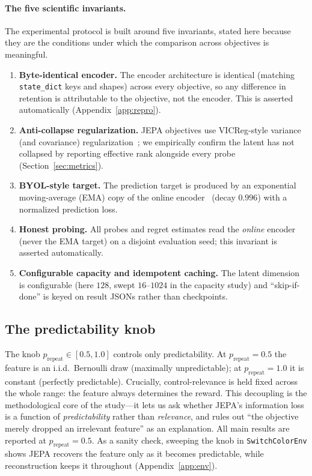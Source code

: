 \documentclass[11pt]{article}
\begin{document}
\paragraph{The five scientific invariants.}
The experimental protocol is built around five invariants, stated here because they are the
conditions under which the comparison across objectives is meaningful.
\begin{enumerate}
  \item \textbf{Byte-identical encoder.} The encoder architecture is identical (matching
  \texttt{state\_dict} keys and shapes) across every objective, so any difference in retention is
  attributable to the objective, not the encoder. This is asserted automatically (Appendix~\ref{app:repro}).
  \item \textbf{Anti-collapse regularization.} JEPA objectives use VICReg-style variance (and
  covariance) regularization~\citep{bardes2022vicreg}; we empirically confirm the latent has not
  collapsed by reporting effective rank alongside every probe (Section~\ref{sec:metrics}).
  \item \textbf{BYOL-style target.} The prediction target is produced by an exponential
  moving-average (EMA) copy of the online encoder~\citep{grill2020byol} (decay $0.996$) with a
  normalized prediction loss.
  \item \textbf{Honest probing.} All probes and regret estimates read the \emph{online} encoder
  (never the EMA target) on a disjoint evaluation seed; this invariant is asserted automatically.
  \item \textbf{Configurable capacity and idempotent caching.} The latent dimension is
  configurable (here $128$, swept $16$--$1024$ in the capacity study) and ``skip-if-done'' is keyed
  on result JSONs rather than checkpoints.
\end{enumerate}

\subsection{The predictability knob}
The knob $p_{\text{repeat}}\in[0.5,1.0]$ controls only predictability. At $p_{\text{repeat}}=0.5$
the feature is an i.i.d.\ Bernoulli draw (maximally unpredictable); at $p_{\text{repeat}}=1.0$ it is
constant (perfectly predictable). Crucially, control-relevance is held fixed across the whole
range: the feature always determines the reward. This decoupling is the methodological core of the
study---it lets us ask whether JEPA's information loss is a function of \emph{predictability} rather
than \emph{relevance}, and rules out ``the objective merely dropped an irrelevant feature'' as an
explanation. All main results are reported at $p_{\text{repeat}}=0.5$. As a sanity check, sweeping
the knob in \texttt{SwitchColorEnv} shows JEPA recovers the feature only as it becomes predictable,
while reconstruction keeps it throughout (Appendix~\ref{app:env}).
\end{document}
